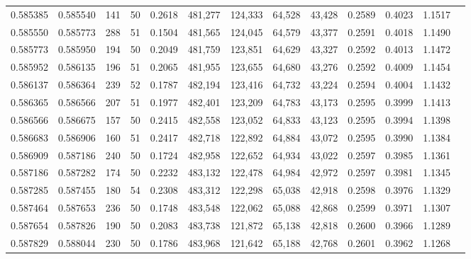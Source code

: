 \begin{tabular}{rrrrrrrrrrrrr}
0.585385 & 0.585540 &   141 &  50 &                                     0.2618 & 481,277 & 124,333 &  64,528 &  43,428 & 0.2589 & 0.4023 & 1.1517 \\
0.585550 & 0.585773 &   288 &  51 &                                     0.1504 & 481,565 & 124,045 &  64,579 &  43,377 & 0.2591 & 0.4018 & 1.1490 \\
0.585773 & 0.585950 &   194 &  50 &                                     0.2049 & 481,759 & 123,851 &  64,629 &  43,327 & 0.2592 & 0.4013 & 1.1472 \\
0.585952 & 0.586135 &   196 &  51 &                                     0.2065 & 481,955 & 123,655 &  64,680 &  43,276 & 0.2592 & 0.4009 & 1.1454 \\
0.586137 & 0.586364 &   239 &  52 &                                     0.1787 & 482,194 & 123,416 &  64,732 &  43,224 & 0.2594 & 0.4004 & 1.1432 \\
0.586365 & 0.586566 &   207 &  51 &                                     0.1977 & 482,401 & 123,209 &  64,783 &  43,173 & 0.2595 & 0.3999 & 1.1413 \\
0.586566 & 0.586675 &   157 &  50 &                                     0.2415 & 482,558 & 123,052 &  64,833 &  43,123 & 0.2595 & 0.3994 & 1.1398 \\
0.586683 & 0.586906 &   160 &  51 &                                     0.2417 & 482,718 & 122,892 &  64,884 &  43,072 & 0.2595 & 0.3990 & 1.1384 \\
0.586909 & 0.587186 &   240 &  50 &                                     0.1724 & 482,958 & 122,652 &  64,934 &  43,022 & 0.2597 & 0.3985 & 1.1361 \\
0.587186 & 0.587282 &   174 &  50 &                                     0.2232 & 483,132 & 122,478 &  64,984 &  42,972 & 0.2597 & 0.3981 & 1.1345 \\
0.587285 & 0.587455 &   180 &  54 &                                     0.2308 & 483,312 & 122,298 &  65,038 &  42,918 & 0.2598 & 0.3976 & 1.1329 \\
0.587464 & 0.587653 &   236 &  50 &                                     0.1748 & 483,548 & 122,062 &  65,088 &  42,868 & 0.2599 & 0.3971 & 1.1307 \\
0.587654 & 0.587826 &   190 &  50 &                                     0.2083 & 483,738 & 121,872 &  65,138 &  42,818 & 0.2600 & 0.3966 & 1.1289 \\
0.587829 & 0.588044 &   230 &  50 &                                     0.1786 & 483,968 & 121,642 &  65,188 &  42,768 & 0.2601 & 0.3962 & 1.1268 \\

\end{tabular}
